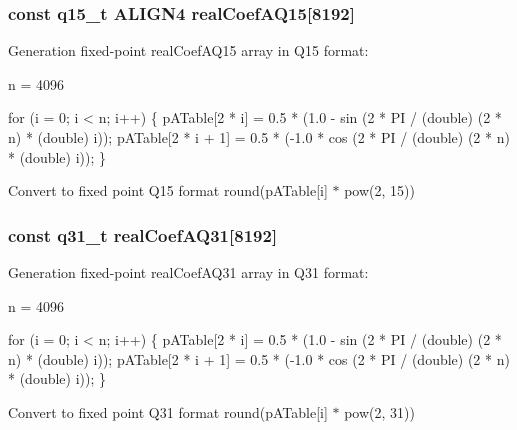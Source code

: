 \subsubsection[{\texorpdfstring{real\+Coef\+A\+Q15}{realCoefAQ15}}]{\setlength{\rightskip}{0pt plus 5cm}const q15\+\_\+t A\+L\+I\+G\+N4 real\+Coef\+A\+Q15\mbox{[}8192\mbox{]}}\hypertarget{group__RealFFT__Table_ga11e84d0ee257a547f749b37dd0078d36}{}\label{group__RealFFT__Table_ga11e84d0ee257a547f749b37dd0078d36}
\begin{DoxyParagraph}{}
Generation fixed-\/point real\+Coef\+A\+Q15 array in Q15 format\+: 
\end{DoxyParagraph}
\begin{DoxyParagraph}{}
n = 4096 
\begin{DoxyPre}for (i = 0; i < n; i++)
 \{
   pATable[2 * i] = 0.5 * (1.0 - sin (2 * PI / (double) (2 * n) * (double) i));
   pATable[2 * i + 1] = 0.5 * (-1.0 * cos (2 * PI / (double) (2 * n) * (double) i));
 \} \end{DoxyPre}
 
\end{DoxyParagraph}
\begin{DoxyParagraph}{}
Convert to fixed point Q15 format round(p\+A\+Table\mbox{[}i\mbox{]} $\ast$ pow(2, 15)) 
\end{DoxyParagraph}
\subsubsection[{\texorpdfstring{real\+Coef\+A\+Q31}{realCoefAQ31}}]{\setlength{\rightskip}{0pt plus 5cm}const q31\+\_\+t real\+Coef\+A\+Q31\mbox{[}8192\mbox{]}}\hypertarget{group__RealFFT__Table_gaf1592a6cf0504675205074a43c3728a2}{}\label{group__RealFFT__Table_gaf1592a6cf0504675205074a43c3728a2}
\begin{DoxyParagraph}{}
Generation fixed-\/point real\+Coef\+A\+Q31 array in Q31 format\+: 
\end{DoxyParagraph}
\begin{DoxyParagraph}{}
n = 4096 
\begin{DoxyPre}for (i = 0; i < n; i++)
\{
   pATable[2 * i] = 0.5 * (1.0 - sin (2 * PI / (double) (2 * n) * (double) i));
   pATable[2 * i + 1] = 0.5 * (-1.0 * cos (2 * PI / (double) (2 * n) * (double) i));
\}\end{DoxyPre}
 
\end{DoxyParagraph}
\begin{DoxyParagraph}{}
Convert to fixed point Q31 format round(p\+A\+Table\mbox{[}i\mbox{]} $\ast$ pow(2, 31)) 
\end{DoxyParagraph}
